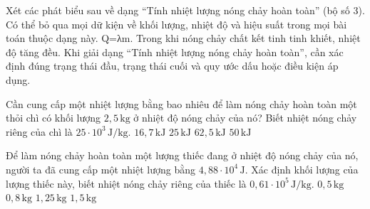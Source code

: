 \begin{ex}
Xét các phát biểu sau về dạng “Tính nhiệt lượng nóng chảy hoàn toàn” (bộ số 3).
\choiceTF
{Có thể bỏ qua mọi dữ kiện về khối lượng, nhiệt độ và hiệu suất trong mọi bài toán thuộc dạng này.}
{\True Q=λm.}
{Trong khi nóng chảy chất kết tinh tinh khiết, nhiệt độ tăng đều.}
{\True Khi giải dạng “Tính nhiệt lượng nóng chảy hoàn toàn”, cần xác định đúng trạng thái đầu, trạng thái cuối và quy ước dấu hoặc điều kiện áp dụng.}
\end{ex}

\begin{ex}
Cần cung cấp một nhiệt lượng bằng bao nhiêu để làm nóng chảy hoàn toàn một thỏi chì có khối lượng $2,5\,\mathrm{kg}$ ở nhiệt độ nóng chảy của nó? Biết nhiệt nóng chảy riêng của chì là $25\cdot 10^3\,\mathrm{J/kg}$.
\choice
{$16,7\,\mathrm{kJ}$}
{$25\,\mathrm{kJ}$}
{\True $62,5\,\mathrm{kJ}$}
{$50\,\mathrm{kJ}$}
\end{ex}

\begin{ex}
Để làm nóng chảy hoàn toàn một lượng thiếc đang ở nhiệt độ nóng chảy của nó, người ta đã cung cấp một nhiệt lượng bằng $4,88\cdot 10^4\,\mathrm{J}$. Xác định khối lượng của lượng thiếc này, biết nhiệt nóng chảy riêng của thiếc là $0,61\cdot 10^5\,\mathrm{J/kg}$.
\choice
{$0,5\,\mathrm{kg}$}
{\True $0,8\,\mathrm{kg}$}
{$1,25\,\mathrm{kg}$}
{$1,5\,\mathrm{kg}$}
\end{ex}

